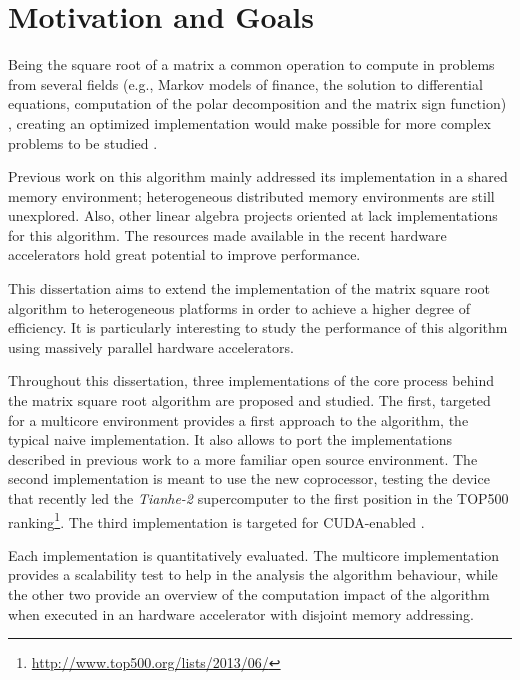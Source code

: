 \documentclass[../thesis]{subfiles}
\begin{document}
	\section{Motivation and Goals}
	\label{sec:intro:goals}

	Being the square root of a matrix a common operation to compute in problems from several fields (e.g., Markov models of finance, the solution to differential equations, computation of the polar decomposition and the matrix sign function) \cite{Higham:2008:FM}, creating an optimized implementation would make possible for more complex problems to be studied \cite{Gustafson:1988}.

	Previous work on this algorithm mainly addressed its implementation in a \cpu shared memory environment; heterogeneous distributed memory environments are still unexplored. Also, other linear algebra projects oriented at \gpus lack implementations for this algorithm. The resources made available in the recent hardware accelerators hold great potential to improve performance.

	This dissertation aims to extend the implementation of the matrix square root algorithm to heterogeneous platforms in order to achieve a higher degree of efficiency. It is particularly interesting to study the performance of this algorithm using massively parallel hardware accelerators.

	Throughout this dissertation, three implementations of the core process behind the matrix square root algorithm are proposed and studied. The first, targeted for a multicore environment provides a first approach to the algorithm, the typical naive implementation. It also allows to port the implementations described in previous work to a more familiar open source environment. The second implementation is meant to use the new \intel\xeonphi coprocessor, testing the device that recently led the \textit{Tianhe-2} supercomputer to the first position in the TOP500 ranking\footnote{\url{http://www.top500.org/lists/2013/06/}}. The third implementation is targeted for CUDA-enabled \gpus.

	Each implementation is quantitatively evaluated. The multicore implementation provides a scalability test to help in the analysis the algorithm behaviour, while the other two provide an overview of the computation impact of the algorithm when executed in an hardware accelerator with disjoint memory addressing.
\end{document}
